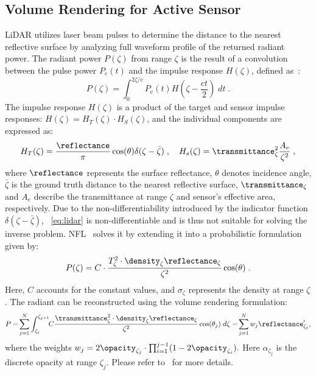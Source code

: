 \subsection{Volume Rendering for Active Sensor} 
\label{sec:vol_render_background}
LiDAR utilizes laser beam pulses to determine the distance to the nearest reflective surface by analyzing full waveform profile of the returned radiant power. The radiant power $P(\zeta)$ from range $\zeta$ is the result of a convolution between the pulse power $P_e(t)$ and the impulse response $H(\zeta)$, defined as~\cite{hahner2021fog,hahner2022lidar,Huang2023nfl}:
\begin{equation}
    P(\zeta) = \int_0^{2\zeta/c} P_e(t) H(\zeta - \frac{ct}{2}) \; dt\;.
\label{eq:lidar}
\end{equation}
The impulse response $H(\zeta)$ is a product of the target and sensor impulse responses: $H(\zeta) = H_T(\zeta)\cdot H_S(\zeta)$, and the individual components are expressed as:
\begin{equation}
    H_T(\zeta) = \frac{\reflectance}{\pi} \cos(\theta) \delta(\zeta - \bar{\zeta})\;, \quad  H_s(\zeta) = \transmittance^2_{\zeta} \frac{A_e}{\zeta^2}\;,
\label{eq:ht}
\end{equation}
where $\reflectance$ represents the surface reflectance, $\theta$ denotes incidence angle, $\bar{\zeta}$ is the ground truth distance to the nearest reflective surface, $\transmittance_{\zeta}$ and $A_e$ describe the transmittance at range $\zeta$ and sensor's effective area, respectively. Due to the non-differentiability introduced by the indicator function $\delta(\zeta - \bar{\zeta})$, ~\cref{eq:lidar} is non-differentiable and is thus not suitable for solving the inverse problem. NFL~\cite{Huang2023nfl} solves it by extending it into a probabilistic formulation given by:
\begin{equation}
P(\zeta) = C \cdot \frac{T^2_{\zeta} \cdot \density_\zeta  \reflectance_\zeta}{\zeta^2} \cos(\theta)\;.
\label{eq:radiance}
\end{equation}
Here, $C$ accounts for the constant values, and $\sigma_\zeta$ represents the density at range $\zeta$. The radiant can be reconstructed using the volume rendering formulation:
\begin{equation}
      P
      =\!\sum_{j=1}^N \int_{\zeta_j}^{\zeta_{j+1}}\!\!C \frac{\transmittance^2_{\zeta} \cdot \density_\zeta \reflectance_\zeta}{\zeta^2} \cos(\theta_j) \; d\zeta
      =\!\sum_{j=1}^N w_j \reflectance_{\zeta_j}',
\label{eq:radiant_inter}
\end{equation}
where the weights $w_j = 2 \opacity_{\zeta_j} \cdot\prod_{i=1}^{j-1}(1 - 2 \opacity_{\zeta_i}).$
Here $\alpha_{\zeta_j}$ is the discrete opacity at range $\zeta_j$. Please refer to~\cite{Huang2023nfl} for more details.


